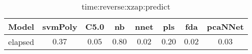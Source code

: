 \begin{table}[!ht]
	\centering
	\begin{tabular}{|c|c|c|c|c|c|c|c|}
		\hline
		Model & svmPoly & C5.0 & nb & nnet & pls & fda & pcaNNet \\ \hline
		elapsed & $0.37$ & $0.05$ & $0.80$ & $0.02$ & $0.20$ & $0.02$ & $0.03$ \\ \hline
	\end{tabular}
	\caption{time:reverse:xzap:predict}
	\label{tab:time:reverse:xzap:predict}
\end{table}
